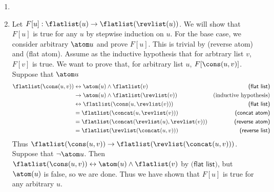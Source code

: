 \begin{exer}[4.1]
    $ $
    \begin{enumerate}[label=(\alph*)]
        \item
        \item
            Let $F[u]: \flatlist(u) \rightarrow \flatlist(\revlist(u))$.
            We will show that $F[u]$ is true for any $u$ by stepwise induction on $u$.
            For the base case, we consider arbitrary $\atom u$ and prove $F[u]$.
            This is trivial by \textsf{(reverse atom)} and \textsf{(flat atom)}.
            Assume as the inductive hypothesis that for arbtrary list $v$, $F[v]$ is true.
            We want to prove that, for arbitrary list $u$, $F[\cons(u, v)]$.
            Suppose that $\atom u$
            \begin{align*}
                \flatlist(\cons(u, v))
                    &\leftrightarrow \atom(u) \land \flatlist(v) & \textsf{(flat list)}\\
                    &\rightarrow \atom(u) \land \flatlist(\revlist(v)) & \text{(inductive hypothesis)}\\
                    &\leftrightarrow \flatlist(\cons(u, \revlist(v))) & \textsf{(flat list)} \\
                    &= \flatlist(\concat(u, \revlist(v))) & \textsf{(concat atom)} \\
                    &= \flatlist(\concat(\revlist(u), \revlist(v))) & \textsf{(reverse atom)} \\
                    &= \flatlist(\revlist(\concat(u, v))) & \textsf{(reverse list)} \\
            \end{align*}
            Thus $\flatlist(\cons(u, v)) \rightarrow \flatlist(\revlist(\concat(u, v)))$.
            Suppose that $\neg\atom u$.
            Then $\flatlist(\cons(u, v)) \leftrightarrow \atom(u) \land \flatlist(v)$ by $\textsf{(flat list)}$, but $\atom(u)$ is false, so we are done.
            Thus we have shown that $F[u]$ is true for any arbitrary $u$.
    \end{enumerate}
\end{exer}
